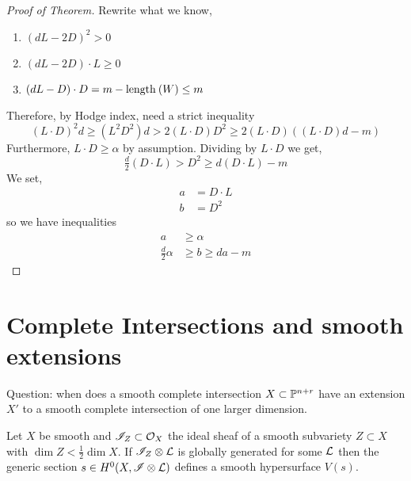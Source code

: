 \documentclass[12pt]{article}
\begin{document}
\begin{proof}[Proof of Theorem]
Rewrite what we know,
\begin{enumerate}
\item $(d L - 2 D)^2 > 0$
\item $(d L - 2 D) \cdot L \ge 0$
\item $(d L - D) \cdot D = m - \length{}{W} \le m$
\end{enumerate}
Therefore, by Hodge index, {\color{red} need a strict inequality}
\[ (L \cdot D)^2 d \ge (L^2 D^2) d > 2 (L \cdot D) D^2 \ge 2 (L \cdot D) ((L \cdot D)d - m) \]  
Furthermore, $L \cdot D \ge \alpha$ by assumption. Dividing by $L \cdot D$ we get,
\[ \tfrac{d}{2} (D \cdot L) > D^2 \ge d (D \cdot L) - m \]
We set,
\begin{align*}
a &= D \cdot L
\\
b &= D^2
\end{align*}
so we have inequalities
\begin{align*}
a &\ge \alpha
\\
\tfrac{d}{2} \alpha &\ge b \ge d a - m
\end{align*} 
\end{proof}


\section{Complete Intersections and smooth extensions}

\newcommand{\cZ}{\mathcal{Z}}

Question: when does a smooth complete intersection $X \subset \P^{n+r}$ have an extension $X'$ to a smooth complete intersection of one larger dimension.

\begin{lemma}
Let $X$ be smooth and $\I_Z \subset \struct{X}$ the ideal sheaf of a smooth subvariety $Z \subset X$ with $\dim{Z} < \frac{1}{2} \dim{X}$. If $\I_Z \ot \L$ is globally generated for some $\L$ then the generic section $s \in H^0(X, \I \ot \L)$ defines a smooth hypersurface $V(s)$. 
\end{lemma}
\end{document}
